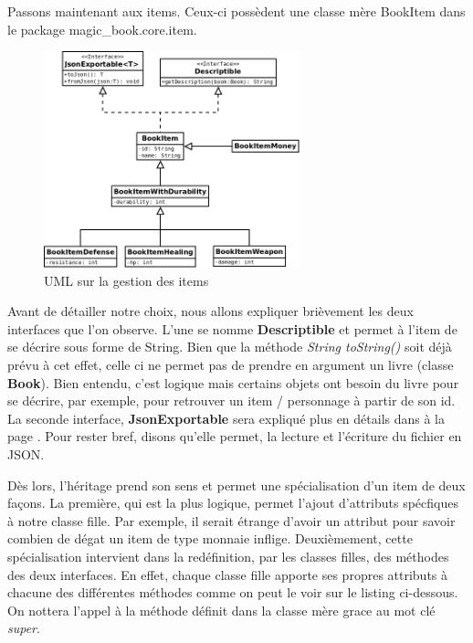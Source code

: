 			Passons maintenant aux items. Ceux-ci possèdent une classe mère BookItem dans le package magic\_book.core.item.

			\begin{figure}[H]
				\centering\includegraphics[width=0.66\textwidth, keepaspectratio]{img/book_item.png}
				\caption{UML sur la gestion des items}
			\end{figure}

			Avant de détailler notre choix, nous allons expliquer brièvement les deux interfaces que l'on observe. L'une se nomme \textbf{Descriptible} et permet à l'item de se décrire sous forme de String. Bien que la méthode \textit{String toString()} soit déjà prévu à cet effet, celle ci ne permet pas de prendre en argument un livre (classe \textbf{Book}). Bien entendu, c'est logique mais certains objets ont besoin du livre pour se décrire, par exemple, pour retrouver un item / personnage à partir de son id. La seconde interface, \textbf{JsonExportable} sera expliqué plus en détails dans  à la page \pageref{subsec:lecture_ecriture_fichier}. Pour rester bref, disons qu'elle permet, la lecture et l'écriture du fichier en JSON.

			Dès lors, l'héritage prend son sens et permet une spécialisation d'un item de deux façons. La première, qui est la plus logique, permet l'ajout d'attributs spécfiques à notre classe fille. Par exemple, il serait étrange d'avoir un attribut pour savoir combien de dégat un item de type monnaie inflige. Deuxièmement, cette spécialisation intervient dans la redéfinition, par les classes filles, des méthodes des deux interfaces. En effet, chaque classe fille apporte ses propres attributs à chacune des différentes méthodes comme on peut le voir sur le listing ci-dessous. On nottera l'appel à la méthode définit dans la classe mère grace au mot clé \textit{super}.

